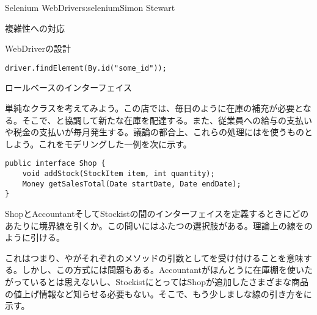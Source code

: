\begin{aosachapter}{Selenium WebDriver}{s:selenium}{Simon Stewart}
\begin{aosasect1}{複雑性への対応}
\begin{aosasect2}{WebDriverの設計}
\begin{verbatim}
driver.findElement(By.id("some_id"));
\end{verbatim}

\begin{aosabox}{ロールベースのインターフェイス}

単純なクラスを考えてみよう。この店では、毎日のように在庫の補充が必要となる。そこで、と協調して新たな在庫を配達する。また、従業員への給与の支払いや税金の支払いが毎月発生する。議論の都合上、これらの処理にはを使うものとしよう。これをモデリングした一例を次に示す。

\begin{verbatim}
public interface Shop {
    void addStock(StockItem item, int quantity);
    Money getSalesTotal(Date startDate, Date endDate);
}
\end{verbatim}

ShopとAccountantそしてStockistの間のインターフェイスを定義するときにどのあたりに境界線を引くか。この問いにはふたつの選択肢がある。理論上の線をのように引ける。

これはつまり、やがそれぞれのメソッドの引数としてを受け付けることを意味する。しかし、この方式には問題もある。Accountantがほんとうに在庫棚を使いたがっているとは思えないし、StockistにとってはShopが追加したさまざまな商品の値上げ情報など知らせる必要もない。そこで、もう少しましな線の引き方をに示す。


\end{aosabox}
\end{aosasect2}
\end{aosasect1}
\end{aosachapter}
